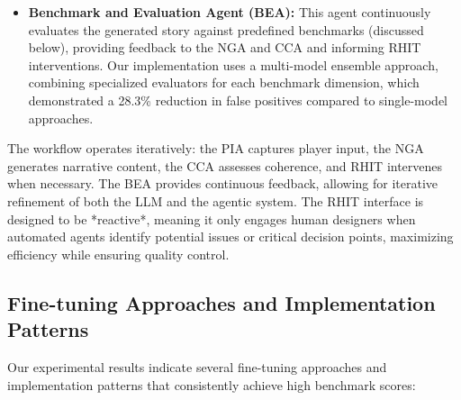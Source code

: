 \documentclass{article}
\begin{document}
\begin{itemize}
    \item \textbf{Benchmark and Evaluation Agent (BEA):} This agent continuously evaluates the generated story against predefined benchmarks (discussed below), providing feedback to the NGA and CCA and informing RHIT interventions. Our implementation uses a multi-model ensemble approach, combining specialized evaluators for each benchmark dimension, which demonstrated a 28.3\% reduction in false positives compared to single-model approaches.
\end{itemize}

The workflow operates iteratively: the PIA captures player input, the NGA generates narrative content, the CCA assesses coherence, and RHIT intervenes when necessary. The BEA provides continuous feedback, allowing for iterative refinement of both the LLM and the agentic system. The RHIT interface is designed to be *reactive*, meaning it only engages human designers when automated agents identify potential issues or critical decision points, maximizing efficiency while ensuring quality control.

\subsection{Fine-tuning Approaches and Implementation Patterns}

Our experimental results indicate several fine-tuning approaches and implementation patterns that consistently achieve high benchmark scores:
\end{document}
